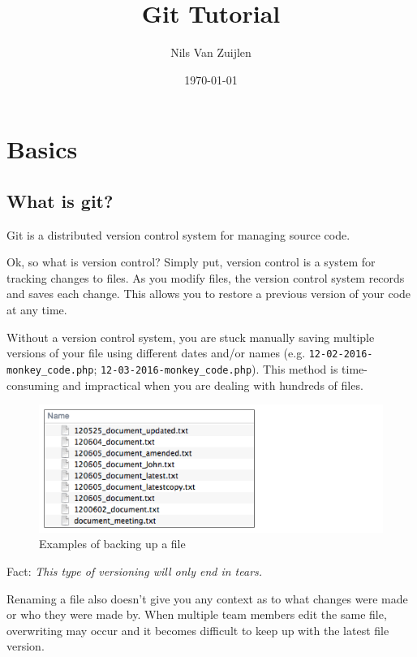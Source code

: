 \documentclass[10pt,a4paper,english]{report}
\title{Git Tutorial}
\author{Nils Van Zuijlen}
\date{\today}
\begin{document}
\maketitle

\tableofcontents

\part{Basics}

\chapter{What is git?}

    Git is a distributed version control system for managing source code.

    Ok, so what is version control? Simply put, version control is a system for tracking changes to files. As you modify files, the version control system records and saves each change. This allows you to restore a previous version of your code at any time.

    Without a version control system, you are stuck manually saving multiple versions of your file using different dates and/or names (e.g. \verb|12-02-2016-monkey_code.php|; \verb|12-03-2016-monkey_code.php|). This method is time-consuming and impractical when you are dealing with hundreds of files.

    \begin{figure}[ht]
    \begin{center}
    \includegraphics[scale=0.5]{images/what_is_git_001.png}
    \end{center}
    \caption{Examples of backing up a file}
    \end{figure}

    Fact: \emph{This type of versioning will only end in tears.}

    Renaming a file also doesn't give you any context as to what changes were made or who they were made by. When multiple team members edit the same file, overwriting may occur and it becomes difficult to keep up with the latest file version.
\end{document}
